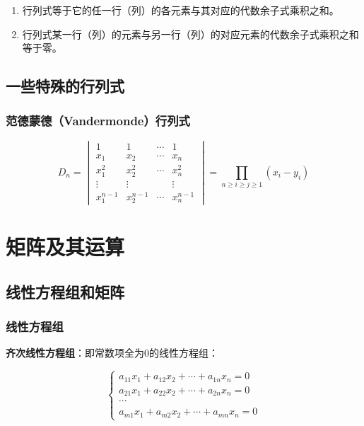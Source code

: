 \documentclass[12pt, a4paper, oneside]{ctexart}
\begin{document}
\begin{enumerate}
  \item 行列式等于它的任一行（列）的各元素与其对应的代数余子式乘积之和。
  \item 行列式某一行（列）的元素与另一行（列）的对应元素的代数余子式乘积之和等于零。
\end{enumerate}

\subsection{一些特殊的行列式}

\subsubsection{范德蒙德（Vandermonde）行列式}

\begin{equation}
  D_n=\begin{vmatrix}
    1 & 1 & \cdots & 1 \\
    x_1 & x_2 & \cdots & x_n \\
    x_1^2 & x_2^2 & \cdots & x_n^2 \\
    \vdots & \vdots & & \vdots \\
    x_1^{n-1} & x_2^{n-1} & \cdots & x_n^{n-1}
  \end{vmatrix}=\prod_{n\geq i\geq j\geq 1} (x_i-y_i)
\end{equation}

\section{矩阵及其运算}

\subsection{线性方程组和矩阵}

\subsubsection{线性方程组}

\textbf{齐次线性方程组}：即常数项全为0的线性方程组：

\begin{equation}
  \left\{\begin{matrix}
    a_{11}x_1+a_{12}x_2+\cdots +a_{1n}x_n=0 \\
    a_{21}x_1+a_{22}x_2+\cdots +a_{2n}x_n=0 \\
    \cdots \\
    a_{m1}x_1+a_{m2}x_2+\cdots +a_{mn}x_n=0
   \end{matrix}\right.
\end{equation}
\end{document}
